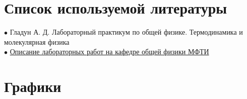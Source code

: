 \section{Список используемой литературы}

$\bullet$ Гладун А. Д. Лабораторный практикум по общей физике. Термодинамика и молекулярная физика\\

$\bullet$ \href{https://mipt.ru/education/chair/physics/S_II/lab/}{Описание лабораторных работ на кафедре общей физики МФТИ}

\newpage

\section{Графики}

\begin{figure}[h]
\end{figure}

\begin{figure}[h]
\end{figure}

